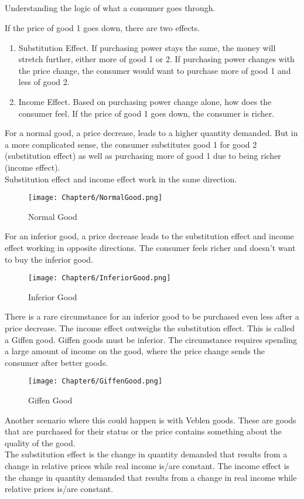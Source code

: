 \subsection{}
Understanding the logic of what a consumer goes through.
\par
If the price of good 1 goes down, there are two effects.
\begin{enumerate}
    \item Substitution Effect. If purchasing power stays the same, the money will stretch further, either more of good 1 or 2.
    If purchasing power changes with the price change, the consumer would want to purchase more of good 1 and less of good 2.
    \item Income Effect. Based on purchasing power change alone, how does the consumer feel. If the price of good 1 goes down, the consumer is richer.
\end{enumerate}
For a normal good, a price decrease, leads to a higher quantity demanded. But in a more complicated sense,
the consumer substitutes good 1 for good 2 (substitution effect) as well as purchasing more of good 1 due to being richer (income effect).\\
Substitution effect and income effect work in the same direction.
\begin{figure}[H]
    \centering
    \texttt{[image: Chapter6/NormalGood.png]}
    \caption{Normal Good}
    \label{fig:Normal_Good}
\end{figure}\par
For an inferior good, a price decrease leads to the substitution effect and income effect working in opposite directions.
The consumer feels richer and doesn't want to buy the inferior good.
\begin{figure}[H]
    \centering
    \texttt{[image: Chapter6/InferiorGood.png]}
    \caption{Inferior Good}
    \label{fig:Inferior_Good}
\end{figure}\par
There is a rare circumstance for an inferior good to be purchased even less after a price decrease.
The income effect outweighs the substitution effect. This is called a Giffen good. Giffen goods must be inferior. The circumstance
requires spending a large amount of income on the good, where the price change sends the consumer after better goods.
\begin{figure}[H]
    \centering
    \texttt{[image: Chapter6/GiffenGood.png]}
    \caption{Giffen Good}
    \label{fig:Giffen_Good}
\end{figure}\par
Another scenario where this could happen is with Veblen goods. These are goods that are purchased for their status or the 
price contains something about the quality of the good.\\
The substitution effect is the change in quantity demanded that results from a change in 
relative prices while real income is/are constant. 
The income effect is the change in quantity demanded that results from a change in real income while  relative prices is/are constant.